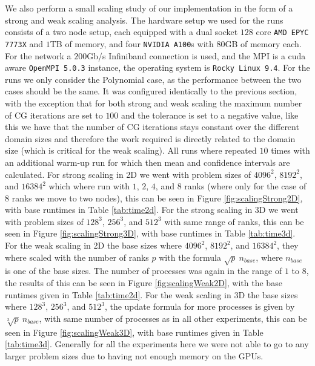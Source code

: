 We also perform a small scaling study of our implementation in the form of a strong and weak scaling analysis. The hardware setup we used for the runs consists of a two node setup, each equipped with a dual socket \(128\) core \texttt{AMD EPYC 7773X} and \(1\)TB of memory, and four \texttt{NVIDIA A100}s with \(80\)GB of memory each. For the network a \(200\)Gb/s Infiniband connection is used, and the MPI is a cuda aware \texttt{OpenMPI 5.0.3} instance, the operating system is \texttt{Rocky Linux 9.4}. For the runs we only consider the Polynomial case, as the performance between the two cases should be the same. It was configured identically to the previous section, with the exception that for both strong and weak scaling the maximum number of CG iterations are set to \(100\) and the tolerance is set to a negative value, like this we have that the number of CG iterations stays constant over the different domain sizes and therefore the work required is directly related to the domain size (which is critical for the weak scaling). All runs where repeated \(10\) times with an additional warm-up run for which then mean and confidence intervals are calculated. For strong scaling in 2D we went with problem sizes of \(4096^2\), \(8192^2\), and \(16384^2\) which where run with \(1\), \(2\), \(4\), and \(8\) ranks (where only for the case of \(8\) ranks we move to two nodes), this can be seen in Figure \ref{fig:scalingStrong2D}, with base runtimes in Table \ref{tab:time2d}. For the strong scaling in 3D we went with problem sizes of \(128^3\), \(256^3\), and \(512^3\) with same range of ranks, this can be seen in Figure \ref{fig:scalingStrong3D}, with base runtimes in Table \ref{tab:time3d}. For the weak scaling in 2D the base sizes where \(4096^2\), \(8192^2\), and \(16384^2\), they where scaled with the number of ranks \(p\) with the formula \(\sqrt{p}\:n_{base}\), where \(n_{base}\) is one of the base sizes. The number of processes was again in the range of \(1\) to \(8\), the results of this can be seen in Figure \ref{fig:scalingWeak2D}, with the base runtimes given in Table \ref{tab:time2d}. For the weak scaling in 3D the base sizes where \(128^3\), \(256^3\), and \(512^3\), the update formula for more processes is given by \(\sqrt[3]{p}\:n_{base}\), with same number of processes as in all other experiments, this can be seen in Figure \ref{fig:scalingWeak3D}, with base runtimes given in Table \ref{tab:time3d}. Generally for all the experiments here we were not able to go to any larger problem sizes due to having not enough memory on the GPUs.\medskip

